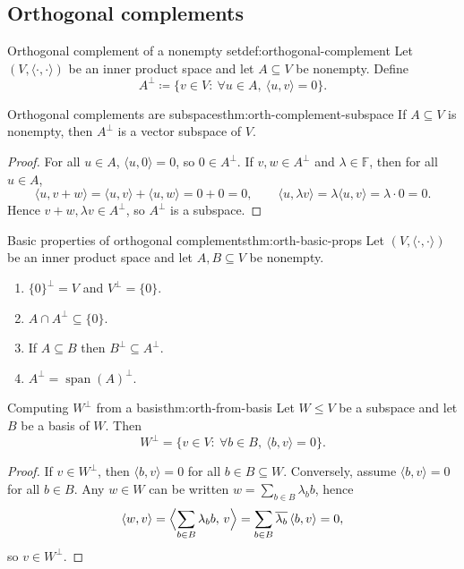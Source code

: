 \subsection{Orthogonal complements}

\begin{definition}{Orthogonal complement of a nonempty set}{def:orthogonal-complement}
Let $(V,\langle\cdot,\cdot\rangle)$ be an inner product space and let $A\subseteq V$ be nonempty.
Define
\[
A^\perp \coloneqq \{v\in V:\ \forall u\in A,\ \langle u,v\rangle=0\}.
\]
\end{definition}

\begin{theorem}{Orthogonal complements are subspaces}{thm:orth-complement-subspace}
If $A\subseteq V$ is nonempty, then $A^\perp$ is a vector subspace of $V$.
\end{theorem}

\begin{proof}
For all $u\in A$, $\langle u,0\rangle=0$, so $0\in A^\perp$.
If $v,w\in A^\perp$ and $\lambda\in\mathbb{F}$, then for all $u\in A$,
\[
\langle u,v+w\rangle=\langle u,v\rangle+\langle u,w\rangle=0+0=0,\qquad
\langle u,\lambda v\rangle=\lambda\langle u,v\rangle=\lambda\cdot 0=0.
\]
Hence $v+w,\lambda v\in A^\perp$, so $A^\perp$ is a subspace.
\end{proof}

\begin{theorem}{Basic properties of orthogonal complements}{thm:orth-basic-props}
Let $(V,\langle\cdot,\cdot\rangle)$ be an inner product space and let $A,B\subseteq V$ be nonempty.
\begin{enumerate}[label=(\alph*),leftmargin=*]
\item $\{0\}^\perp = V$ and $V^\perp=\{0\}$.
\item $A\cap A^\perp \subseteq \{0\}$.
\item If $A\subseteq B$ then $B^\perp\subseteq A^\perp$.
\item $A^\perp=\operatorname{span}(A)^\perp$.
\end{enumerate}
\end{theorem}

\begin{theorem}{Computing $W^\perp$ from a basis}{thm:orth-from-basis}
Let $W\le V$ be a subspace and let $B$ be a basis of $W$. Then
\[
W^\perp=\{v\in V:\ \forall b\in B,\ \langle b,v\rangle=0\}.
\]
\end{theorem}

\begin{proof}
If $v\in W^\perp$, then $\langle b,v\rangle=0$ for all $b\in B\subseteq W$.
Conversely, assume $\langle b,v\rangle=0$ for all $b\in B$. Any $w\in W$ can be written $w=\sum_{b\in B}\lambda_b b$, hence
\[
\langle w,v\rangle=\Bigl\langle \sum_{b\in B}\lambda_b b,\,v\Bigr\rangle
=\sum_{b\in B}\overline{\lambda_b}\,\langle b,v\rangle=0,
\]
so $v\in W^\perp$.
\end{proof}

